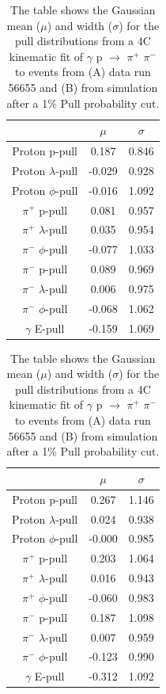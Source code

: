 \begin{table}
\centering
\begin{subtable}{.5\textwidth}
\centering
\caption{ }
\begin{tabular}{ |c|c|c| }
\hline
                                                &$\mu$   &$\sigma$ \\
                               \hline
Proton p-pull                            & 0.187  & 0.846  \\
\hline
Proton $\lambda$-pull                      & -0.029 & 0.928  \\
\hline
Proton $\phi$-pull                         & -0.016 & 1.092  \\
\hline
$\pi^{+}$ p-pull        & 0.081  & 0.957  \\
\hline
$\pi^{+}$ $\lambda$-pull & 0.035  & 0.954  \\
\hline
$\pi^{-}$ $\phi$-pull    & -0.077 & 1.033  \\
\hline
$\pi^{-}$ p-pull        & 0.089  & 0.969  \\
\hline
$\pi^{-}$ $\lambda$-pull & 0.006  & 0.975  \\
\hline
$\pi^{-}$ $\phi$-pull    & -0.068 & 1.062  \\
\hline
$\gamma$ E-pull   & -0.159 & 1.069 \\
\hline
\end{tabular}
\end{subtable}%
\begin{subtable}{.5\textwidth}
\centering
\caption{ }
\begin{tabular}{ |c|c|c| }
\hline
                                         &$\mu$   &$\sigma$ \\ \hline
Proton p-pull                             & 0.267  & 1.146  \\
\hline
Proton $\lambda$-pull                  & 0.024  & 0.938  \\
\hline
Proton $\phi$-pull                         & -0.000 & 0.985  \\
\hline
$\pi^{+}$ p-pull        & 0.203  & 1.064  \\
\hline
$\pi^{+}$ $\lambda$-pull & 0.016  & 0.943  \\
\hline
$\pi^{+}$ $\phi$-pull    & -0.060 & 0.983  \\
\hline
$\pi^{-}$ p-pull        & 0.187  & 1.098  \\
\hline
$\pi^{-}$ $\lambda$-pull & 0.007  & 0.959  \\
\hline
$\pi^{-}$ $\phi$-pull    & -0.123 & 0.990  \\
\hline
$\gamma$ E-pull                           & -0.312 & 1.092  \\ 
\hline
\end{tabular}
\end{subtable}%
\caption{The table shows the Gaussian mean ($\mu$) and width ($\sigma$) for the pull distributions from a 4C kinematic fit of  $\gamma$ p $\rightarrow$ $\pi^{+}$ $\pi^{-}$ to events from (A) data run 56655 and (B) from simulation after a 1$\%$ Pull probability cut.} 
\label{tab2}
\end{table}

